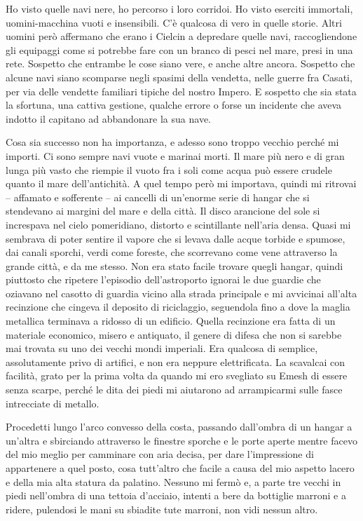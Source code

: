 Ho visto quelle navi nere, ho percorso i loro corridoi. Ho visto
eserciti immortali, uomini-macchina vuoti e insensibili. C'è qualcosa di
vero in quelle storie. Altri uomini però affermano che erano i Cielcin a
depredare quelle navi, raccogliendone gli equipaggi come si potrebbe
fare con un branco di pesci nel mare, presi in una rete. Sospetto che
entrambe le cose siano vere, e anche altre ancora. Sospetto che alcune
navi siano scomparse negli spasimi della vendetta, nelle guerre fra
Casati, per via delle vendette familiari tipiche del nostro Impero. E
sospetto che sia stata la sfortuna, una cattiva gestione, qualche errore
o forse un incidente che aveva indotto il capitano ad abbandonare la sua
nave.

Cosa sia successo non ha importanza, e adesso sono troppo vecchio perché
mi importi. Ci sono sempre navi vuote e marinai morti. Il mare più nero
e di gran lunga più vasto che riempie il vuoto fra i soli come acqua può
essere crudele quanto il mare dell'antichità. A quel tempo però mi
importava, quindi mi ritrovai -- affamato e sofferente -- ai cancelli di
un'enorme serie di hangar che si stendevano ai margini del mare e della
città. Il disco arancione del sole si increspava nel cielo pomeridiano,
distorto e scintillante nell'aria densa. Quasi mi sembrava di poter
sentire il vapore che si levava dalle acque torbide e spumose, dai
canali sporchi, verdi come foreste, che scorrevano come vene attraverso
la grande città, e da me stesso. Non era stato facile trovare quegli
hangar, quindi piuttosto che ripetere l'episodio dell'astroporto
{ignorai} le due guardie che oziavano nel casotto di guardia vicino alla
strada principale e mi avvicinai all'alta recinzione che cingeva il
deposito di riciclaggio, seguendola fino a dove la maglia metallica
terminava a ridosso di un edificio. Quella recinzione era fatta di un
materiale economico, misero e antiquato, il genere di difesa che non si
sarebbe mai trovata su uno dei vecchi mondi imperiali. Era qualcosa di
semplice, assolutamente privo di artifici, e non era neppure
elettrificata. La scavalcai con facilità, grato per la prima volta da
quando mi ero svegliato su Emesh di essere senza scarpe, perché le dita
dei piedi mi aiutarono ad arrampicarmi sulle fasce intrecciate di
metallo.

Procedetti lungo l'arco convesso della costa, passando dall'ombra di un
hangar a un'altra e sbirciando attraverso le finestre sporche e le porte
aperte mentre facevo del mio meglio per camminare con aria decisa, per
dare l'impressione di appartenere a quel posto, cosa tutt'altro che
facile a causa del mio aspetto lacero e della mia alta statura da
palatino. Nessuno mi fermò e, a parte tre vecchi in piedi nell'ombra di
una tettoia d'acciaio, intenti a bere da bottiglie marroni e a ridere,
pulendosi le mani su sbiadite tute marroni, non vidi nessun altro.

